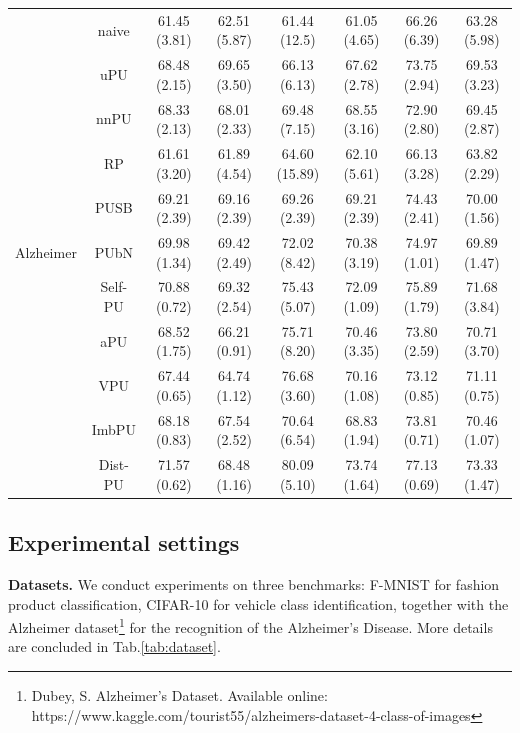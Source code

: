 \documentclass[final]{cvpr}
\newcommand{\ccmark}{\checkmark}%
\newcommand{\blankM}{\color{white}{\checkmark}}
\newcommand{\best}[1]{\textcolor[RGB]{205,83,76}{#1}}
\newcommand{\secondb}[1]{\textcolor[RGB]{0,115,194}{#1}}
\begin{document}
\begin{table}[htp]
{\begin{tabular}{c|c|cccccc}
\hline
    \multirow{11}[3]{*}{Alzheimer} & naive & 61.45 (3.81) \ccmark & 62.51 (5.87) \ccmark & 61.44 (12.5) \ccmark & 61.05 (4.65) \ccmark & 66.26 (6.39) \ccmark & 63.28 (5.98) \ccmark \\
          & uPU   & 68.48 (2.15) \ccmark & \best{69.65 (3.50)} \blankM & 66.13 (6.13) \ccmark & 67.62 (2.78) \ccmark & 73.75 (2.94) \ccmark & 69.53 (3.23) \ccmark \\
          & nnPU  & 68.33 (2.13) \ccmark & 68.01 (2.33) \blankM & 69.48 (7.15) \ccmark & 68.55 (3.16) \ccmark & 72.90 (2.80) \ccmark & 69.45 (2.87) \ccmark \\
          & RP    & 61.61 (3.20) \ccmark & 61.89 (4.54) \ccmark & 64.60 (15.89) \blankM & 62.10 (5.61) \ccmark & 66.13 (3.28) \ccmark & 63.82 (2.29) \ccmark \\
          & PUSB  & 69.21 (2.39) \blankM & 69.16 (2.39) \blankM  & 69.26 (2.39) \ccmark & 69.21 (2.39) \ccmark & 74.43 (2.41) \ccmark & 70.00 (1.56) \ccmark \\
          & PUbN & 69.98 (1.34) \ccmark & \secondb{69.42 (2.49) \blankM} & 72.02 (8.42) \ccmark & 70.38 (3.19) \blankM & 74.97 (1.01) \ccmark & 69.89 (1.47) \ccmark \\
          & Self-PU & \secondb{70.88 (0.72) \ccmark} & 69.32 (2.54) \blankM & 75.43 (5.07) \blankM & \secondb{72.09 (1.09) \ccmark} & \secondb{75.89 (1.79) \ccmark} & \secondb{71.68 (3.84) \blankM} \\
          & aPU & 68.52 (1.75) \ccmark & 66.21 (0.91) \ccmark & 75.71 (8.20) \blankM & 70.46 (3.35) \blankM & 73.80 (2.59) \ccmark & 70.71 (3.70) \ccmark \\
          & VPU   & 67.44 (0.65) \ccmark & 64.74 (1.12) \ccmark & \secondb{76.68 (3.60) \blankM} & 70.16 (1.08) \ccmark & 73.12 (0.85) \ccmark & 71.11 (0.75) \blankM \\
          & ImbPU & 68.18 (0.83) \ccmark & 67.54 (2.52) \ccmark & 70.64 (6.54) \ccmark & 68.83 (1.94) \ccmark & 73.81 (0.71) \ccmark & 70.46 (1.07) \ccmark \\
\cline{2-8}          & Dist-PU & \best{71.57 (0.62) \blankM} & 68.48 (1.16) \blankM & \best{80.09 (5.10) \blankM} & \best{73.74 (1.64) \blankM} & \best{77.13 (0.69) \blankM} & \best{73.33 (1.47) \blankM} \\
    \hline
    \hline
    \end{tabular}%
    }
  \label{tab:com_results}%
\end{table}%

\subsection{Experimental settings}
\textbf{Datasets.} We conduct experiments on three benchmarks: F-MNIST \cite{xiao2017/online} for fashion product classification, CIFAR-10 \cite{krizhevsky2009learning} for vehicle class identification, together with the Alzheimer dataset\footnote{Dubey, S. Alzheimer’s Dataset. Available online: \\ https://www.kaggle.com/tourist55/alzheimers-dataset-4-class-of-images} for the recognition of the Alzheimer’s Disease. More details are concluded in Tab.\ref{tab:dataset}.
\end{document}
